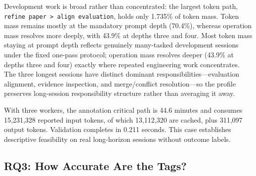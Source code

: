 \documentclass[letterpaper]{article}
\begin{document}
Development work is broad rather than concentrated: the largest token path,
\texttt{refine paper > align evaluation}, holds only 1.735\% of token mass.
Token mass remains mostly at the mandatory prompt depth (70.4\%), whereas
operation mass resolves more deeply, with 43.9\% at depths three and four.
Most token mass staying at prompt depth reflects genuinely many-tasked
development sessions under the fixed one-pass protocol; operation mass
resolves deeper (43.9\% at depths three and four) exactly where repeated
engineering work concentrates.
The three longest sessions have distinct dominant responsibilities---evaluation
alignment, evidence inspection, and merge/conflict resolution---so the profile
preserves long-session responsibility structure rather than averaging it away.

With three workers, the annotation critical path is 44.6 minutes and consumes
15{,}231{,}328 reported input tokens, of which 13{,}112{,}320 are cached,
plus 311{,}097 output tokens.
Validation completes in 0.211 seconds.
This case establishes descriptive feasibility on real long-horizon sessions
without outcome labels.

\subsection{RQ3: How Accurate Are the Tags?}
\end{document}
